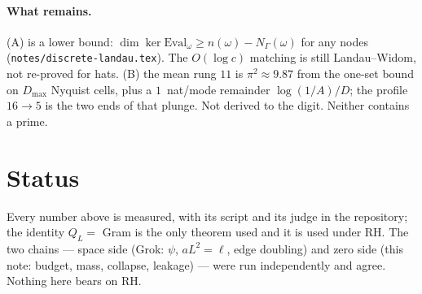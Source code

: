 \documentclass[11pt]{article}
\begin{document}
\paragraph{What remains.} (A) is a lower bound: $\dim\ker\mathrm{Eval}_\omega\ge n(\omega)-N_\Gamma(\omega)$ for any nodes (\texttt{notes/discrete-landau.tex}). The $O(\log c)$ matching is still Landau--Widom, not re-proved for hats. (B) the mean rung $11$ is $\pi^2\approx9.87$ from the one-set bound on $D_{\max}$ Nyquist cells, plus a $1$~nat/mode remainder $\log(1/A)/D$; the profile $16\to5$ is the two ends of that plunge. Not derived to the digit. Neither contains a prime.

\section*{Status}
Every number above is measured, with its script and its judge in the repository; the identity $Q_L=$ Gram is the only theorem used and it is used under RH. The two chains --- space side (Grok: $\psi$, $a L^2=\ell$, edge doubling) and zero side (this note: budget, mass, collapse, leakage) --- were run independently and agree. Nothing here bears on RH.
\end{document}

